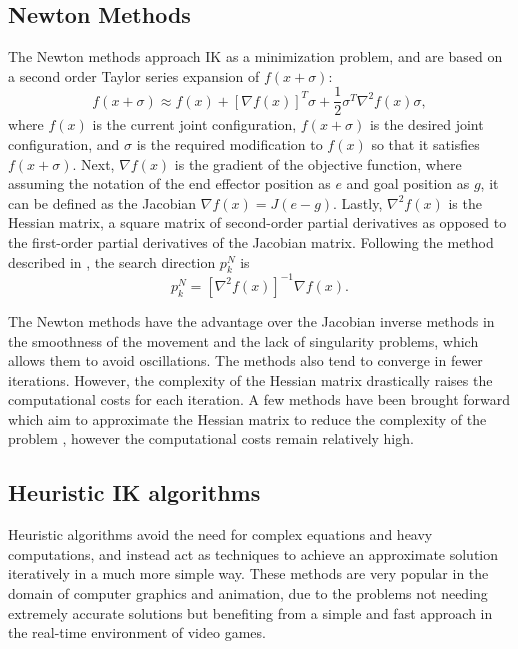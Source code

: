 \subsection{Newton Methods}
The Newton methods approach IK as a minimization problem, and are based on
a second order Taylor series expansion of \(f(x + \sigma)\):
\begin{equation}
    f(x + \sigma) \approx f(x) + [\nabla f(x)]^T \sigma + \frac{1}{2} \sigma^T
    \nabla^2 f(x) \sigma,
\end{equation}
where \(f(x)\) is the current joint configuration, \(f(x + \sigma)\)
is the desired joint configuration, and \(\sigma\) is the required modification
to \(f(x)\) so that it satisfies \(f(x + \sigma)\). Next, \(\nabla f(x)\) is
the gradient of the objective function, where assuming the notation of the end
effector position as \(e\) and goal position as \(g\), it can be defined as the
Jacobian \(\nabla f(x) = J(e - g)\). Lastly, \(\nabla^2 f(x)\) is the Hessian
matrix, a square matrix of second-order partial derivatives as opposed to the
first-order partial derivatives of the Jacobian matrix. Following the method
described in \cite{nocedal_newton}, the search direction \(p^N_k\) is
\begin{equation}
    p^N_k = [\nabla^2 f(x)]^{-1} \nabla f(x).
\end{equation}

The Newton methods have the advantage over the Jacobian inverse methods in the
smoothness of the movement and the lack of singularity problems, which allows
them to avoid oscillations. The methods also tend to converge
in fewer iterations. However, the complexity of the Hessian matrix drastically
raises the computational costs for each iteration. A few methods have been
brought forward which aim to approximate the Hessian matrix to reduce the
complexity of the problem \cite{fletcher_newton, siciliano_1990,
Chin1997ClosedformAG}, however the computational costs remain relatively high. 

\subsection{Heuristic IK algorithms}
Heuristic algorithms avoid the need for complex equations and heavy
computations, and instead act as techniques to achieve an approximate solution
iteratively in a much more simple way. These methods are very popular in the
domain of computer graphics and animation, due to the problems not needing
extremely accurate solutions but benefiting from a simple and fast approach in
the real-time environment of video games. \\

